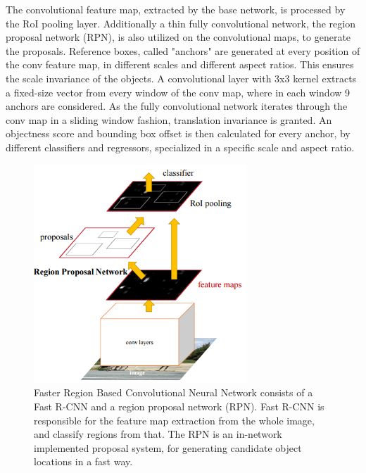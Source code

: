 The convolutional feature map, extracted by the base network, is processed by the RoI pooling layer. Additionally a thin fully convolutional network, the region proposal network (RPN), is also utilized on the convolutional maps, to generate the proposals. Reference boxes, called "anchors" are generated at every position of the conv feature map, in different scales and different aspect ratios. This ensures the scale invariance of the objects. A convolutional layer with 3x3 kernel extracts a fixed-size vector from every window of the conv map, where in each window 9 anchors are considered. As the fully convolutional network iterates through the conv map in a sliding window fashion, translation invariance is granted. An objectness score and bounding box offset is then calculated for every anchor, by different classifiers and regressors, specialized in a specific scale and aspect ratio.
\bigbreak
\begin{figure}[h!]
	\centering
	\includegraphics[width=8cm]{images/mt/faster-rcnn.png}
	\caption{Faster Region Based Convolutional Neural Network consists of a Fast R-CNN and a region proposal network (RPN). Fast R-CNN is responsible for the feature map extraction from the whole image, and classify regions from that. The RPN is an in-network implemented proposal system, for generating candidate object locations in a fast way.}
	\label{fig:faster-rcnn}
\end{figure}
\bigbreak
